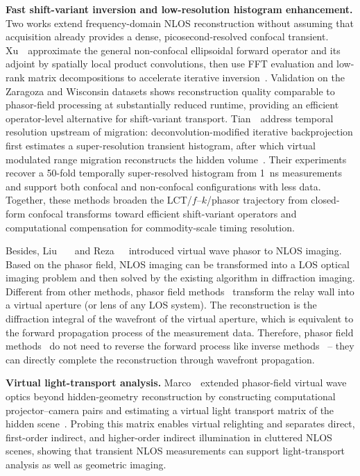 \vspace{0.8mm}
\noindent \textbf{Fast shift-variant inversion and low-resolution histogram enhancement.}
Two works extend frequency-domain NLOS reconstruction without assuming that acquisition already provides a dense, picosecond-resolved confocal transient. Xu~\etal~approximate the general non-confocal ellipsoidal forward operator and its adjoint by spatially local product convolutions, then use FFT evaluation and low-rank matrix decompositions to accelerate iterative inversion~\cite{xuProductConvolutionNLOS2022}. Validation on the Zaragoza and Wisconsin datasets shows reconstruction quality comparable to phasor-field processing at substantially reduced runtime, providing an efficient operator-level alternative for shift-variant transport. Tian~\etal~address temporal resolution upstream of migration: deconvolution-modified iterative backprojection first estimates a super-resolution transient histogram, after which virtual modulated range migration reconstructs the hidden volume~\cite{tianVirtualRMAHistograms2025}. Their experiments recover a 50-fold temporally super-resolved histogram from 1~ns measurements and support both confocal and non-confocal configurations with less data. Together, these methods broaden the LCT/$f$--$k$/phasor trajectory from closed-form confocal transforms toward efficient shift-variant operators and computational compensation for commodity-scale timing resolution.

Besides, Liu~ \etal~\cite{liuPhasorFieldDiffraction2020,liuVirtualWaveOptics2018}~and Reza~\etal~\cite{rezaPhasorFieldWaves2019}~introduced virtual wave phasor to NLOS imaging. Based on the phasor field, NLOS imaging can be transformed into a LOS optical imaging problem and then solved by the existing algorithm in diffraction imaging. 
Different from other methods, phasor field methods~\cite{liuPhasorFieldDiffraction2020,liuVirtualWaveOptics2018} transform the relay wall into a virtual aperture (or lens of any LOS system). The reconstruction is the diffraction integral of the wavefront of the virtual aperture, which is equivalent to the forward propagation process of the measurement data. Therefore, phasor field methods~\cite{liuPhasorFieldDiffraction2020,liuVirtualWaveOptics2018} do not need to reverse the forward process like inverse methods~\cite{otooleConfocalNonlineofsightImaging2018,veltenRecoveringThreedimensionalShape2012} -- they can directly complete the reconstruction through wavefront propagation.

\vspace{0.8mm}
\noindent \textbf{Virtual light-transport analysis.}
Marco~\etal~extended phasor-field virtual wave optics beyond hidden-geometry reconstruction by constructing computational projector--camera pairs and estimating a virtual light transport matrix of the hidden scene~\cite{marcoVirtualLightTransport2021}. Probing this matrix enables virtual relighting and separates direct, first-order indirect, and higher-order indirect illumination in cluttered NLOS scenes, showing that transient NLOS measurements can support light-transport analysis as well as geometric imaging.

